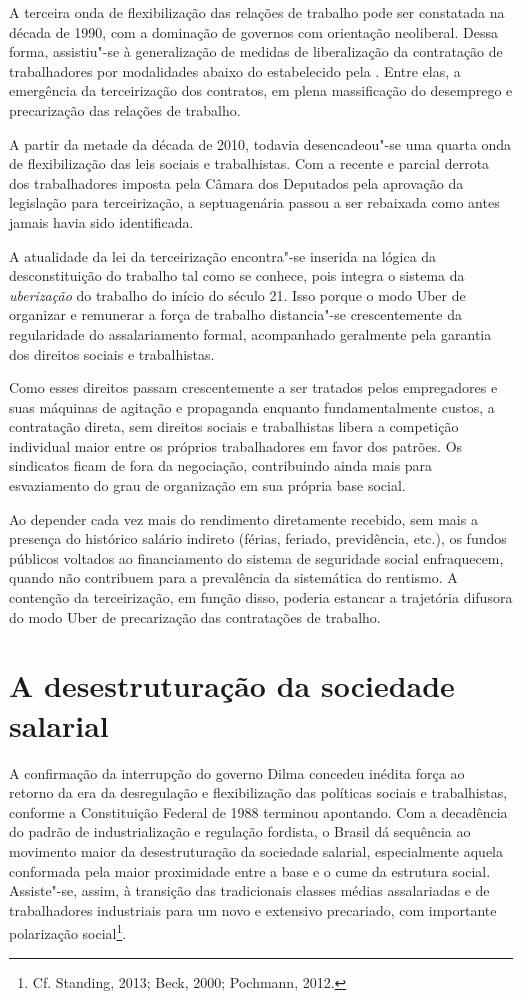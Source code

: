 A terceira onda de flexibilização das relações de trabalho pode ser
constatada na década de 1990, com a dominação de governos com orientação
neoliberal. Dessa forma, assistiu"-se à generalização de medidas de
liberalização da contratação de trabalhadores por modalidades abaixo do
estabelecido pela . Entre elas, a emergência da
terceirização dos contratos, em plena massificação do desemprego e
precarização das relações de trabalho.

A partir da metade da década de 2010, todavia desencadeou"-se uma quarta
onda de flexibilização das leis sociais e trabalhistas. Com a recente e
parcial derrota dos trabalhadores imposta pela Câmara dos Deputados pela
aprovação da legislação para terceirização, a septuagenária  passou a
ser rebaixada como antes jamais havia sido identificada.

A atualidade da lei da terceirização encontra"-se inserida na lógica da
desconstituição do trabalho tal como se conhece, pois integra o sistema
da \emph{uberização} do trabalho do início do século 21. Isso porque o
modo Uber de organizar e remunerar a força de trabalho distancia"-se
crescentemente da regularidade do assalariamento formal, acompanhado
geralmente pela garantia dos direitos sociais e trabalhistas.

Como esses direitos passam crescentemente a ser
tratados pelos empregadores e suas máquinas de agitação e propaganda
enquanto fundamentalmente custos, a contratação direta, sem direitos
sociais e trabalhistas libera a competição individual maior entre os
próprios trabalhadores em favor dos patrões. Os sindicatos ficam de fora
da negociação, contribuindo ainda mais para esvaziamento do grau de
organização em sua própria base social.

Ao depender cada vez mais do rendimento diretamente recebido, sem mais a
presença do histórico salário indireto (férias, feriado, previdência,
etc.), os fundos públicos voltados ao financiamento do sistema de
seguridade social enfraquecem, quando não contribuem para a prevalência
da sistemática do rentismo. A contenção da terceirização, em função
disso, poderia estancar a trajetória difusora do modo Uber de
precarização das contratações de trabalho.

\section{A desestruturação da sociedade salarial}

A confirmação da interrupção do governo Dilma concedeu inédita força ao
retorno da era da desregulação e flexibilização das políticas sociais e
trabalhistas, conforme a Constituição Federal de 1988 terminou
apontando. Com a decadência do padrão de industrialização e regulação
fordista, o Brasil dá sequência ao movimento maior da desestruturação da
sociedade salarial, especialmente aquela conformada pela maior
proximidade entre a base e o cume da estrutura social. Assiste"-se,
assim, à transição das tradicionais classes médias assalariadas e de
trabalhadores industriais para um novo e extensivo precariado, com
importante polarização social\footnote{Cf. Standing, 2013; Beck, 2000; Pochmann,
2012.}.

